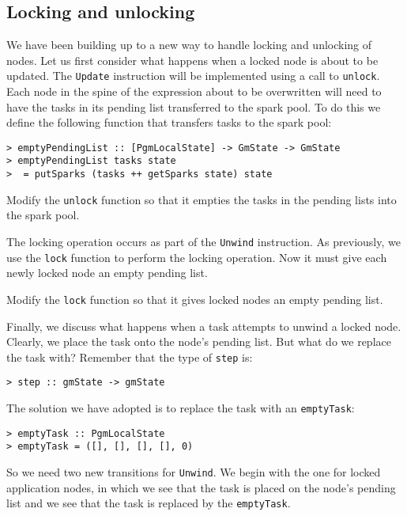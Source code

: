 \subsection{Locking and unlocking}

We have been building up to a new way to handle locking and unlocking
of nodes. Let us first consider what happens when a locked node is
about to be updated. The \mbox{\tt Update} instruction will be implemented
using a call to \mbox{\tt unlock}. Each node in the spine of the expression
about to be overwritten will need to have the tasks in its pending
list transferred to the spark pool. To do this we define the following
function that transfers tasks to the spark pool:
\begin{verbatim}
> emptyPendingList :: [PgmLocalState] -> GmState -> GmState
> emptyPendingList tasks state
>  = putSparks (tasks ++ getSparks state) state
\end{verbatim}
%
%
\begin{exercise}\label{pgm:X:unlock}
Modify the \mbox{\tt unlock} function so that it empties the tasks in the
pending lists into the spark pool.
\end{exercise}

The locking operation occurs as part of the \mbox{\tt Unwind} instruction. As
previously, we use the \mbox{\tt lock} function to perform the locking
operation. Now it must give each newly locked node an empty pending
list.

\begin{exercise}\label{pgm:X:lock}
Modify the \mbox{\tt lock} function so that it gives locked nodes an empty
pending list.
\end{exercise}

Finally, we discuss what happens when a task attempts to unwind a
locked node. Clearly, we place the task onto the node's pending list.
But what do we replace the task with? Remember that the type of \mbox{\tt step}
is:
\begin{verbatim}
> step :: gmState -> gmState
\end{verbatim}
%
The solution we have adopted is to replace the task with an
\mbox{\tt emptyTask}:
\begin{verbatim}
> emptyTask :: PgmLocalState
> emptyTask = ([], [], [], [], 0)
\end{verbatim}
%
%
\par
So we need two new transitions for \mbox{\tt Unwind}. We begin with the one for
locked application nodes, in which we see that the task is placed on
the node's pending list and we see that the task is replaced by the
\mbox{\tt emptyTask}.

